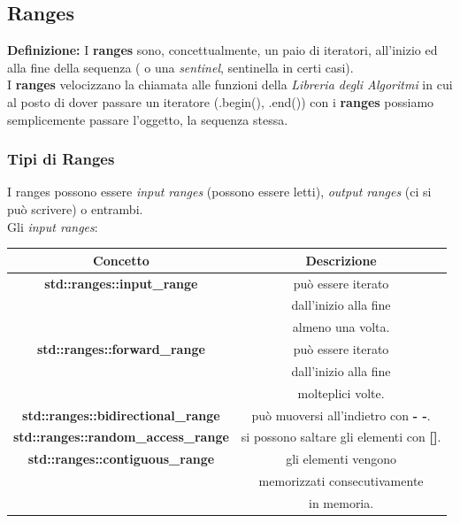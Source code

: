 \subsection{Ranges}

\label{ranges}


\textsf{\small \textbf{Definizione: } I \textbf{ranges} sono, concettualmente, un paio di iteratori, all'inizio ed alla fine della sequenza ( o una \emph{sentinel}, sentinella in certi casi).} \\

\textsf{\small I \textbf{ranges} velocizzano la chiamata alle funzioni della \emph{Libreria degli Algoritmi} in cui al posto di dover passare un iteratore (.begin(), .end()) con i \textbf{ranges} possiamo semplicemente passare l'oggetto, la sequenza stessa.} \break

\subsubsection{Tipi di Ranges}

\textsf{\small I ranges possono essere \emph{input ranges} (possono essere letti), \emph{output ranges} (ci si può scrivere) o entrambi.} \\

\textsf{\small Gli \emph{input ranges}: } \\

\begin{tabular}{|c|c|}
	\hline
	\textbf{Concetto} & \textbf{Descrizione} \\
	\hline
	\textsf{\small \textbf{std::ranges::input\_range}} & \textsf{\small può essere iterato } \\
	\textsf{\small \textbf{}} & \textsf{\small dall'inizio alla fine } \\
	\textsf{\small } & \textsf{\small almeno una volta.} \\
	\hline
	\textsf{\small \textbf{std::ranges::forward\_range}} & \textsf{\small può essere iterato } \\
	\textsf{\small \textbf{}} & \textsf{\small dall'inizio alla fine } \\
	\textsf{\small } & \textsf{\small molteplici volte.} \\
	\hline
	\textsf{\small \textbf{std::ranges::bidirectional\_range}} & \textsf{\small può muoversi all'indietro con \textbf{- -}.} \\
	\hline
	\textsf{\small \textbf{std::ranges::random\_access\_range}} & \textsf{\small si possono saltare gli elementi con \textbf{[]}.} \\
	\hline
	\textsf{\small \textbf{std::ranges::contiguous\_range}} & \textsf{\small gli elementi vengono } \\
	\textsf{\small \textbf{}} & \textsf{\small memorizzati consecutivamente } \\
	\textsf{\small } & \textsf{\small in memoria.} \\
	\hline
\end{tabular}

